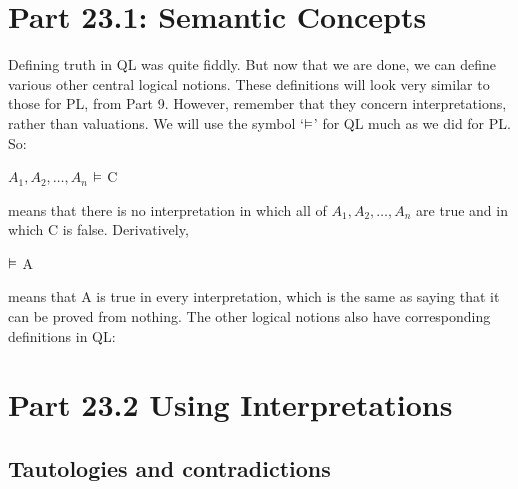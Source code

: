 \section{Part 23.1: Semantic Concepts}
Defining truth in QL was quite fiddly. But now that we are done, we can define various other central logical notions. These definitions will look very similar to those for PL, from Part 9. However, remember that they concern interpretations, rather than valuations. We will use the symbol ‘$\vDash$’ for QL much as we did for PL. So:
\begin{center}
$A_1,A_2,\ldots,A_n$ $\vDash$ C
\end{center}
means that there is no interpretation in which all of $A_1,A_2,\ldots,A_n$ are true and in which C is false. Derivatively,
\begin{center}
$\vDash$ A
\end{center}
means that A is true in every interpretation, which is the same as saying that it can be proved from nothing. The other logical notions also have corresponding definitions in QL:
\section{Part 23.2 Using Interpretations}
\subsection{Tautologies and contradictions}

